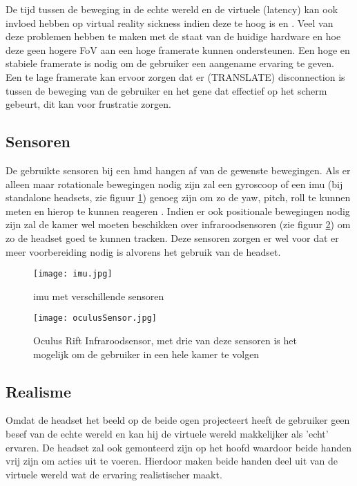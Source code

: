 De tijd tussen de beweging in de echte wereld en de virtuele (latency) kan ook invloed hebben op virtual reality sickness indien deze te hoog is \autocite{Elbamby2018} en \autocite{DiZio2000}. 
Veel van deze problemen hebben te maken met de staat van de huidige hardware en hoe deze geen hogere FoV aan een hoge framerate kunnen ondersteunen. Een hoge en stabiele framerate is nodig om de gebruiker een aangename ervaring te geven. Een te lage framerate kan ervoor zorgen dat er (TRANSLATE) disconnection is tussen de beweging van de gebruiker en het gene dat effectief op het scherm gebeurt, dit kan voor frustratie zorgen.

\subsection{Sensoren}
De gebruikte sensoren bij een \acrshort{hmd} hangen af van de gewenste bewegingen. Als er alleen maar rotationale bewegingen nodig zijn zal een gyroscoop of een \acrfull{imu} (bij standalone headsets, zie figuur \ref{fig:imu}) genoeg zijn om zo de yaw, pitch, roll te kunnen meten en hierop te kunnen reageren \autocite{LaValle2014}. Indien er ook positionale bewegingen nodig zijn zal de kamer wel moeten beschikken over infraroodsensoren (zie figuur \ref{fig:oculusSensor}) om zo de headset goed te kunnen tracken. Deze sensoren zorgen er wel voor dat er meer voorbereiding nodig is alvorens het gebruik van de headset.

\begin{figure}
    \texttt{[image: imu.jpg]}
    \caption{\acrshort{imu} met verschillende sensoren \autocite{Shirsath2018}}
    \label{fig:imu}
\end{figure}

\begin{figure}
    \texttt{[image: oculusSensor.jpg]}
    \caption{Oculus Rift Infraroodsensor, met drie van deze sensoren is het mogelijk om de gebruiker in een hele kamer te volgen}
    \label{fig:oculusSensor}
\end{figure}


\subsection{Realisme}
Omdat de headset het beeld op de beide ogen projecteert heeft de gebruiker geen besef van de echte wereld en kan hij de virtuele wereld makkelijker als 'echt' ervaren. De headset zal ook gemonteerd zijn op het hoofd waardoor beide handen vrij zijn om acties uit te voeren. Hierdoor maken beide handen deel uit van de virtuele wereld wat de ervaring realistischer maakt.
